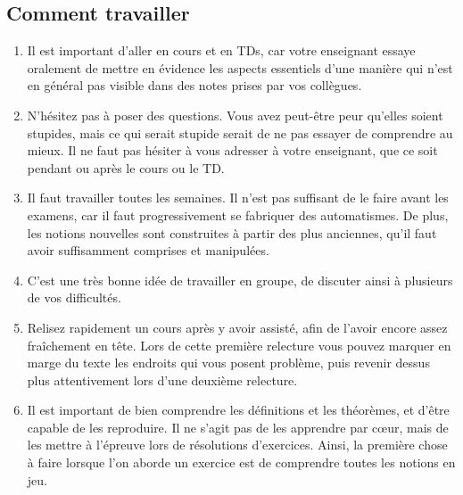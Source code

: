 %
%


\subsection{Comment travailler}

\begin{enumerate}
\item  Il est important d'aller en cours et en TDs, car votre enseignant essaye oralement
    de mettre en évidence les aspects essentiels d'une manière qui n'est en général pas
    visible dans des notes prises par vos collègues.

\item N'hésitez pas à poser des questions. Vous avez peut-être peur qu'elles soient
    stupides, mais ce qui serait stupide serait de ne pas essayer de comprendre au mieux.
    Il ne faut pas hésiter à vous adresser à votre enseignant,
    que ce soit pendant ou après le cours ou le TD.

\item Il faut travailler toutes les semaines. Il n'est pas suffisant de le faire avant les examens,
    car il faut progressivement se fabriquer des automatismes. De plus, les notions nouvelles
    sont construites à partir des plus anciennes, qu'il faut avoir suffisamment comprises et
    manipulées.

\item C'est une très bonne idée de travailler en groupe, de discuter ainsi à plusieurs de
    vos difficultés.

\item Relisez rapidement un cours après y avoir assisté, afin de l'avoir encore assez
    fraîchement en tête. Lors de cette première relecture vous pouvez marquer en marge
    du texte les endroits qui vous posent problème, puis revenir dessus  plus attentivement
    lors d'une deuxième relecture.

\item Il est important de bien comprendre les définitions et les théorèmes,
    et d'être capable de les reproduire.
    Il ne s'agit pas de les apprendre par c\oe ur, mais de les mettre à l'épreuve lors de
    résolutions d'exercices. Ainsi, la première chose à faire lorsque l'on aborde un exercice est
    de comprendre toutes les notions en jeu.


\end{enumerate}
